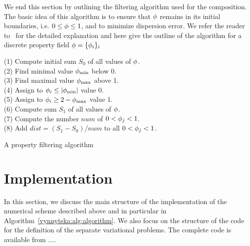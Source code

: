We end this section by outlining the filtering algorithm used for the
composition. The basic idea of this algorithm is to ensure that
$\phi$ remains in its initial boundaries, i.e. $0 \leq
\phi \leq 1$, and to minimize dispersion error.  We refer the
reader to~\citet{LenardicKaula1993} for the detailed explanation and
here give the outline of the algorithm for a discrete property field
$\phi = \{\phi_i \}_{i}$
\begin{algorithm}
  \begin{tabbing}
  (1) Compute initial sum $S_0$ of all values of $\phi$. \\
  (2) Find minimal value $\phi_{\min}$ below 0. \\
  (3) Find maximal value $\phi_{\max}$ above 1. \\
  (4) Assign to $\phi_i \leq | \phi_{\min} |$ value 0. \\
  (5) Assign to $\phi_i \geq 2 - \phi_{\max} $ value 1. \\
  (6) Compute sum $S_1$ of all values of $\phi$. \\
  (7) Compute the number $num$ of $0 < \phi_j < 1$. \\
  (8) Add $dist = (S_1 - S_0)/num$ to all $ 0 < \phi_j < 1$.
  \end{tabbing}
  \caption{A property filtering algorithm}
  \label{vynnytska:alg:filtering}
\end{algorithm}


\section{Implementation}

In this section, we discuss the main structure of the implementation
of the numerical scheme described above and in particular in
Algorithm~\ref{vynnytska:alg:algorithm}. We also focus on the
structure of the code for the definition of the separate variational
problems. The complete code is available from $\dots$.

